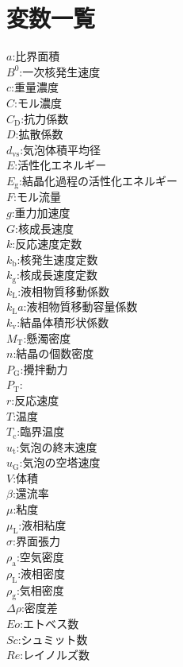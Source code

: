 \documentclass[a4j]{jsreport}
\begin{document}
\clearpage
\chapter*{変数一覧}
\begin{multicols}{2}
\begin{flushleft}
    $a$:比界面積 \\
    $B^0$:一次核発生速度 \\
    $c$:重量濃度 \\
    $C$:モル濃度 \\
    $C_\mathrm{D}$:抗力係数 \\
    $D$:拡散係数 \\
    $d_\mathrm{vs}$:気泡体積平均径 \\
    $E$:活性化エネルギー \\
    $E_\mathrm{g}$:結晶化過程の活性化エネルギー \\
    $F$:モル流量 \\
    $g$:重力加速度 \\
    $G$:核成長速度 \\
    $k$:反応速度定数 \\
    $k_\mathrm{b}$:核発生速度定数 \\
    $k_\mathrm{g}$:核成長速度定数 \\
    $k_\mathrm{L}$:液相物質移動係数 \\
    $k_\mathrm{L}a$:液相物質移動容量係数 \\
    $k_\mathrm{v}$:結晶体積形状係数 \\
    $M_\mathrm{T}$:懸濁密度 \\
    $n$:結晶の個数密度 \\
    $P_\mathrm{G}$:攪拌動力 \\
    $P_\mathrm{T}$: \\
    $r$:反応速度 \\
    $T$:温度 \\
    $T_\mathrm{c}$:臨界温度 \\
    $u_\mathrm{t}$:気泡の終末速度 \\
    $u_\mathrm{G}$:気泡の空塔速度 \\
    $V$:体積 \\
    $\beta$:還流率 \\
    $\mu$:粘度 \\
    $\mu_\mathrm{L}$:液相粘度 \\
    $\sigma$:界面張力 \\
    $\rho_\mathrm{a}$:空気密度 \\
    $\rho_\mathrm{L}$:液相密度 \\
    $\rho_\mathrm{g}$:気相密度 \\
    $\varDelta\rho$:密度差 \\
    $Eo$:エトベス数 \\
    $Sc$:シュミット数 \\
    $Re$:レイノルズ数
\end{flushleft}
\end{multicols}
\end{document}
